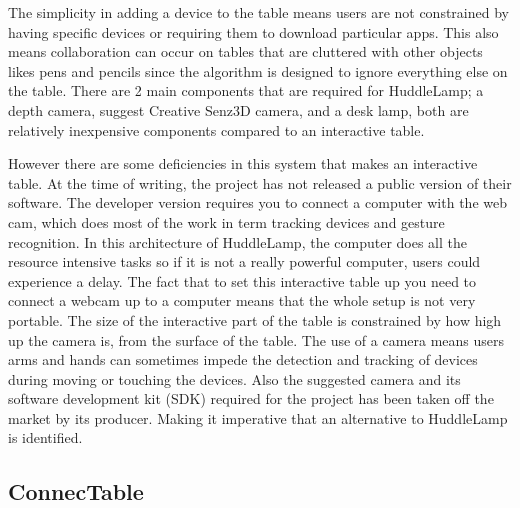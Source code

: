 The simplicity in adding a device to the table means users are not
constrained by having specific devices or requiring them to download
particular apps. This also means collaboration can occur on tables
that are cluttered with other objects likes pens and pencils since the algorithm is designed to ignore everything else on the table. There
are 2 main components that are required for HuddleLamp;
a depth camera, \citeauthor{huddlelamp-paper} suggest Creative Senz3D\cite{creative-senz3d} camera, and a desk lamp, both
are relatively inexpensive components compared to an interactive table.

However there are some deficiencies in this system that makes
an interactive table. At the time of writing, the project has not
released a public version of their software. The developer
version requires you to connect a computer with the web cam, which
does most of the work in term tracking devices and gesture recognition. In this architecture
of HuddleLamp, the computer does all the resource intensive tasks so if it is
not a really powerful computer, users could experience a delay. The fact
that to set this interactive table up you need to connect a webcam up
to a computer means that the whole setup is not very portable. The
size of the interactive part of the table is constrained by how high
up the camera is, from the surface of the table. The use of a camera
means users arms and hands can sometimes impede the
detection and tracking of devices during moving or touching the devices.
Also the suggested camera and its software development kit (SDK) required
for the project has been taken off the market by its producer. Making
it imperative that an alternative to HuddleLamp is identified.

\subsection{ConnecTable}


